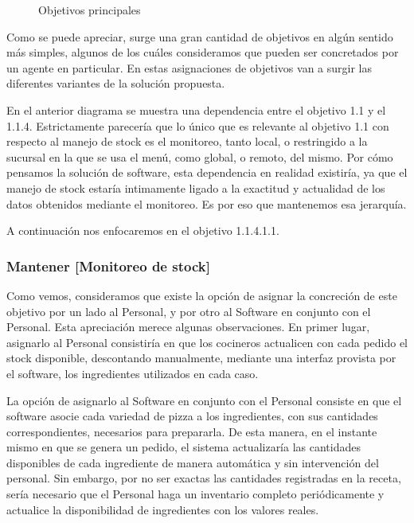 \documentclass[a4paper,10pt]{article}
\begin{document}
\begin{figure}[H]
\centering
{}
\caption{Objetivos principales}
\end{figure}

Como se puede apreciar, surge una gran cantidad de objetivos en algún sentido más simples, algunos de los cuáles consideramos que pueden ser concretados por un agente en particular. En estas asignaciones de objetivos van a surgir las diferentes variantes de la solución propuesta. 

En el anterior diagrama se muestra una dependencia entre el objetivo 1.1 y el 1.1.4. Estrictamente parecería que lo único que es relevante al objetivo 1.1 con respecto al manejo de stock es el monitoreo, tanto local, o restringido a la sucursal en la que se usa el menú, como global, o remoto, del mismo. Por cómo pensamos la solución de software, esta dependencia en realidad existiría, ya que el manejo de stock estaría intimamente ligado a la exactitud y actualidad de los datos obtenidos mediante el monitoreo. Es por eso que mantenemos esa jerarquía.


A continuación nos enfocaremos en el objetivo 1.1.4.1.1. 
\subsubsection*{Mantener [Monitoreo de stock]}
Como vemos, consideramos que existe la opción de asignar la concreción de este objetivo por un lado al Personal, y por otro al Software en conjunto con el Personal. Esta apreciación merece algunas observaciones.
En primer lugar, asignarlo al Personal consistiría en que los cocineros actualicen con cada pedido el stock disponible, descontando manualmente, mediante una interfaz provista por el software, los ingredientes utilizados en cada caso.  


La opción de asignarlo al Software en conjunto con el Personal consiste en que el software asocie cada variedad de pizza a los ingredientes, con sus cantidades correspondientes, necesarios para prepararla. De esta manera, en el instante mismo en que se genera un pedido, el sistema actualizaría las cantidades disponibles de cada ingrediente de manera automática y sin intervención del personal. Sin embargo, por no ser exactas las cantidades registradas en la receta, sería necesario que el Personal haga un inventario completo periódicamente y actualice la disponibilidad de ingredientes con los valores reales.
\end{document}
